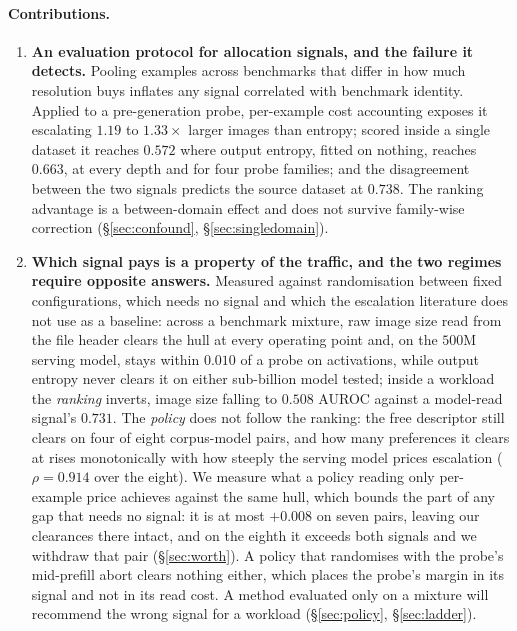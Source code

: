 \documentclass[10pt,twocolumn]{article}
\theoremstyle{plain}
\begin{document}
\paragraph{Contributions.}
\begin{enumerate}\itemsep2pt
  \item \textbf{An evaluation protocol for allocation signals, and the failure
  it detects.} Pooling examples across benchmarks that differ in how much
  resolution buys inflates any signal correlated with benchmark identity.
  Applied to a pre-generation probe, per-example cost accounting exposes it
  escalating $1.19$ to $1.33\times$ larger images than entropy; scored
  inside a single dataset it reaches $0.572$ where output entropy, fitted on
  nothing, reaches $0.663$, at every depth and for four probe families; and the
  disagreement between the two signals predicts the source dataset at $0.738$.
  The ranking advantage is a between-domain effect and does not survive
  family-wise correction (\S\ref{sec:confound}, \S\ref{sec:singledomain}).
  \item \textbf{Which signal pays is a property of the traffic, and the two
  regimes require opposite answers.} Measured against randomisation between
  fixed configurations, which needs no signal and which the escalation
  literature does not use as a baseline: across a benchmark mixture, raw image
  size read from the file header clears the hull at every operating point and,
  on the $500$M serving model, stays within $0.010$ of a probe on activations,
  while output entropy never clears it on either sub-billion model tested;
  inside a workload the \emph{ranking} inverts, image size falling to $0.508$
  AUROC against a model-read signal's $0.731$. The \emph{policy} does not
  follow the ranking: the free descriptor still clears on four of eight
  corpus-model pairs, and how many preferences it clears at rises monotonically
  with how steeply the serving model prices escalation ($\rho = 0.914$ over the
  eight). We measure what a policy reading only per-example price achieves
  against the same hull, which bounds the part of any gap that needs no signal:
  it is at most $+0.008$ on seven pairs, leaving our clearances there intact,
  and on the eighth it exceeds both signals and we withdraw that pair
  (\S\ref{sec:worth}). A policy that randomises
  with the probe's mid-prefill abort clears nothing either, which places the
  probe's margin in its signal and not in its read cost. A method evaluated
  only on a mixture will recommend the wrong signal for a workload
  (\S\ref{sec:policy}, \S\ref{sec:ladder}).

\end{enumerate}
\end{document}
